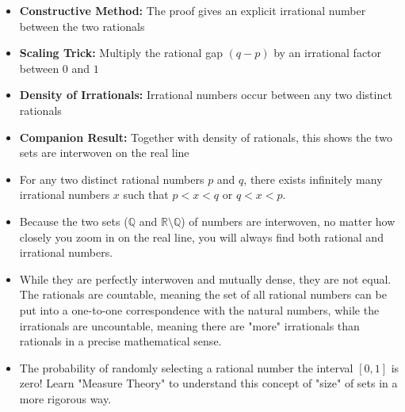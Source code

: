 \begin{takeaways}
\begin{itemize}
\item \textbf{Constructive Method:} The proof gives an explicit irrational number between the two rationals
\item \textbf{Scaling Trick:} Multiply the rational gap $(q-p)$ by an irrational factor between $0$ and $1$
\item \textbf{Density of Irrationals:} Irrational numbers occur between any two distinct rationals
\item \textbf{Companion Result:} Together with density of rationals, this shows the two sets are interwoven on the real line
\item For any two distinct rational numbers $p$ and $q$, there exists infinitely many irrational numbers $x$ such that $p < x < q$ or $q < x < p$.
\item Because the two sets ($\mathbb{Q}$ and $\mathbb{R} \setminus \mathbb{Q}$) of numbers are interwoven, no matter how closely you zoom in on the real line, you will always find both rational and irrational numbers.
\item While they are perfectly interwoven and mutually dense, they are not equal. The rationals are countable, meaning the set of all rational numbers can be put into a one-to-one correspondence with the natural numbers, while the irrationals are uncountable, meaning there are "more" irrationals than rationals in a precise mathematical sense.
\item The probability of randomly selecting a rational number the interval $[0, 1]$ is zero! Learn "Measure Theory" to understand this concept of "size" of sets in a more rigorous way.
\end{itemize}
\end{takeaways}
